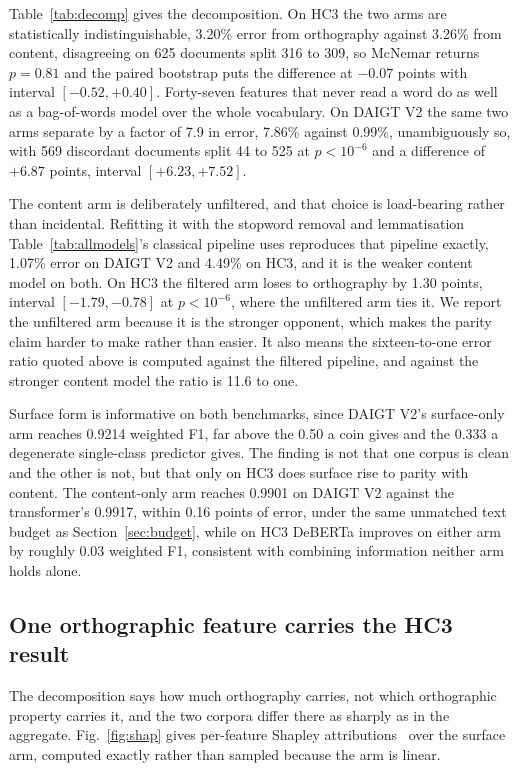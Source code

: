 Table~\ref{tab:decomp} gives the decomposition. On HC3 the two arms are statistically indistinguishable, 3.20\% error from orthography against 3.26\% from content, disagreeing on 625 documents split 316 to 309, so McNemar returns $p=0.81$ and the paired bootstrap puts the difference at $-0.07$ points with interval $[-0.52, +0.40]$. Forty-seven features that never read a word do as well as a bag-of-words model over the whole vocabulary. On DAIGT V2 the same two arms separate by a factor of 7.9 in error, 7.86\% against 0.99\%, unambiguously so, with 569 discordant documents split 44 to 525 at $p < 10^{-6}$ and a difference of $+6.87$ points, interval $[+6.23, +7.52]$.

The content arm is deliberately unfiltered, and that choice is load-bearing rather than incidental. Refitting it with the stopword removal and lemmatisation Table~\ref{tab:allmodels}'s classical pipeline uses reproduces that pipeline exactly, 1.07\% error on DAIGT V2 and 4.49\% on HC3, and it is the weaker content model on both. On HC3 the filtered arm loses to orthography by 1.30 points, interval $[-1.79, -0.78]$ at $p < 10^{-6}$, where the unfiltered arm ties it. We report the unfiltered arm because it is the stronger opponent, which makes the parity claim harder to make rather than easier. It also means the sixteen-to-one error ratio quoted above is computed against the filtered pipeline, and against the stronger content model the ratio is 11.6 to one.

Surface form is informative on both benchmarks, since DAIGT V2's surface-only arm reaches 0.9214 weighted F1, far above the 0.50 a coin gives and the 0.333 a degenerate single-class predictor gives. The finding is not that one corpus is clean and the other is not, but that only on HC3 does surface rise to parity with content. The content-only arm reaches 0.9901 on DAIGT V2 against the transformer's 0.9917, within 0.16 points of error, under the same unmatched text budget as Section~\ref{sec:budget}, while on HC3 DeBERTa improves on either arm by roughly 0.03 weighted F1, consistent with combining information neither arm holds alone.

\subsection{One orthographic feature carries the HC3 result}
\label{sec:shap}

The decomposition says how much orthography carries, not which orthographic property carries it, and the two corpora differ there as sharply as in the aggregate. Fig.~\ref{fig:shap} gives per-feature Shapley attributions~\cite{Lundberg2017unified} over the surface arm, computed exactly rather than sampled because the arm is linear.

